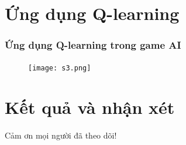 \documentclass{beamer}
\begin{document}
\section{Ứng dụng Q-learning}
\begin{frame}
\frametitle{Ứng dụng Q-learning trong game AI }
\begin{figure}[H]
  \begin{center}
    \texttt{[image: s3.png]}
  \end{center}
  \label{s1}
\end{figure}
\end{frame}


\section{Kết quả và nhận xét}










\begin{frame}
\Huge{\centerline{Cảm ơn mọi người đã theo dõi!}}
\end{frame}

\end{document}
